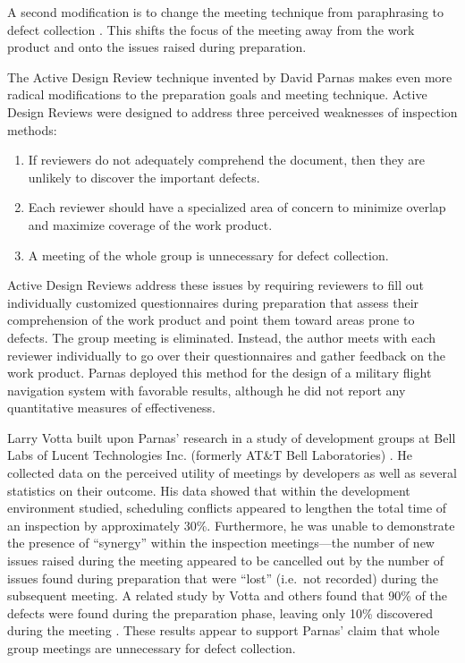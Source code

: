 A second modification is to change the meeting technique from paraphrasing
to defect collection \cite{Gilb93,Humphrey90}.  This shifts the focus of the
meeting away from the work product and onto the issues raised during
preparation. 

The Active Design Review technique \cite{Parnas85} invented by David Parnas
makes even more radical modifications to the preparation goals and meeting
technique. Active Design Reviews were designed to address three perceived
weaknesses of inspection methods:

\begin{enumerate}
\item If reviewers do not adequately comprehend the document, then they are
      unlikely to discover the important defects. 
\item Each reviewer should have a specialized area of concern to minimize 
      overlap and maximize coverage of the work product.
\item A meeting of the whole group is unnecessary for defect collection. 
\end{enumerate}

Active Design Reviews address these issues by requiring reviewers to fill
out individually customized questionnaires during preparation that assess
their comprehension of the work product and point them toward areas prone
to defects.  The group meeting is eliminated. Instead, the author meets
with each reviewer individually to go over their questionnaires and gather
feedback on the work product. Parnas deployed this method for the design
of a military flight navigation system with favorable results, although he
did not report any quantitative measures of effectiveness.

Larry Votta built upon Parnas' research in a study of development groups at 
Bell Labs of Lucent Technologies Inc. (formerly AT\&T Bell Laboratories)
\cite{Votta93}.  He collected data on the perceived utility of
meetings by developers as well as several statistics on their outcome. His
data showed that within the development environment studied, scheduling
conflicts appeared to lengthen the total time of an inspection by
approximately 30\%.  Furthermore, he was unable to demonstrate the presence
of ``synergy'' within the inspection meetings---the number of new issues
raised during the meeting appeared to be cancelled out by the number of issues
found during preparation that were ``lost'' (i.e.~not recorded) during the
subsequent meeting.  A related study by Votta and others found that 90\% of
the defects were found during the preparation phase, leaving only 10\%
discovered during the meeting \cite{Eick92}.  These results appear to
support Parnas' claim that whole group meetings are unnecessary for defect
collection.

